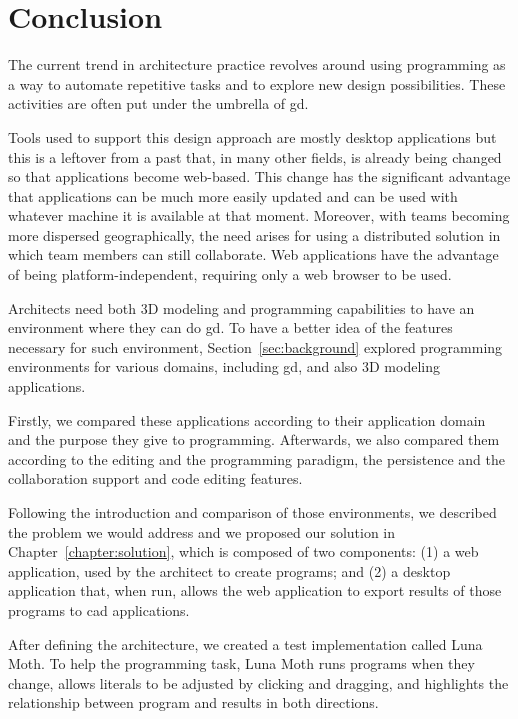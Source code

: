 
\section{Conclusion}
\label{sec:conclusion}


The current trend in architecture practice revolves around using programming as a way to automate repetitive tasks and to explore new design possibilities.
These activities are often put under the umbrella of \acrfull{gd}.

Tools used to support this design approach are mostly desktop applications but this is a leftover from a past that, in many other fields, is already being changed so that applications become web-based.
This change has the significant advantage that applications can be much more easily updated and can be used with whatever machine it is available at that moment.
Moreover, with teams becoming more dispersed geographically, the need arises for using a distributed solution in which team members can still collaborate.
Web applications have the advantage of being platform-independent, requiring only a web browser to be used.

Architects need both 3D modeling and programming capabilities to have an environment where they can do \gls{gd}.
To have a better idea of the features necessary for such environment, Section~\ref{sec:background} explored programming environments for various domains, including \gls{gd}, and also 3D modeling applications.

Firstly, we compared these applications according to their application domain and the purpose they give to programming.
Afterwards, we also compared them according to the editing and the programming paradigm, the persistence and the collaboration support and code editing features.

Following the introduction and comparison of those environments, we described the problem we would address and we proposed our solution in Chapter~\ref{chapter:solution}, which is composed of two components:
(1) a web application, used by the architect to create programs;
and (2) a desktop application that, when run, allows the web application to export results of those programs to \gls{cad} applications.

After defining the architecture, we created a test implementation called Luna Moth.
To help the programming task, Luna Moth runs programs when they change, allows literals to be adjusted by clicking and dragging, and highlights the relationship between program and results in both directions.


